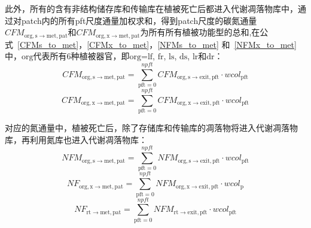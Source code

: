 此外，所有的含有非结构储存库和传输库在植被死亡后都进入代谢凋落物库中，通过对patch内的所有pft尺度通量加权求和，得到patch尺度的碳氮通量$CFM_{\mathrm{org,{s}\rightarrow met,pat}}$和$CFM_{\mathrm{org,x\rightarrow met,pat}}$为所有所有植被功能型的总和,在公式~\eqref{CFMs_to_met}，\eqref{CFMx_to_met}，\eqref{NFMs_to_met} 和~\eqref{NFMx_to_met} 中，${\mathrm {org}}$代表所有6种植被器官，即$\text{org=lf}$, ${\mathrm {fr}}$, ${\mathrm {ls}}$, ${\mathrm {ds}}$, ${\mathrm {lr}}$和${\mathrm {dr}}$：
\begin{equation}\label{CFMs_to_met}
  CFM_{\mathrm{org,{s}\rightarrow met,pat}}=\sum_{\mathrm{pft=0}}^{npft}{CFM_{\mathrm{org,{s}\rightarrow exit,pft}}\cdot{wcol_{\mathrm{pft}}}}
\end{equation}
\begin{equation}\label{CFMx_to_met}
  CFM_{\mathrm{org,{x}\rightarrow met,pat}}=\sum_{\mathrm{pft=0}}^{npft}{CFM_{\mathrm{org,{x}\rightarrow exit,pft}}\cdot{wcol_{\mathrm{pft}}}}
\end{equation}

对应的氮通量中，植被死亡后，除了存储库和传输库的凋落物将进入代谢凋落物库，再利用氮库也进入代谢凋落物库：
\begin{equation}\label{NFMs_to_met}
  NFM_{\mathrm{org,{s}\rightarrow met,pat}}=\sum_{\mathrm{pft=0}}^{npft}{NFM_{\mathrm{org,{s}\rightarrow exit,pft}}\cdot{wcol_{\mathrm{pft}}}}
\end{equation}
\begin{equation}\label{NFMx_to_met}
  NF_{\mathrm{org,{x}\rightarrow met,pat}}=\sum_{\mathrm{pft=0}}^{npft}{NFM_{\mathrm{org,{x}\rightarrow exit,pft}}\cdot{wcol_{\mathrm {p}} }}
\end{equation}
\begin{equation}
  NF_{\mathrm{rt\rightarrow met,pat}}=\sum_{\mathrm{pft=0}}^{npft}{NFM_{\mathrm{rt\rightarrow exit,pft}}\cdot{wcol_{\mathrm{pft}}}}
\end{equation}
